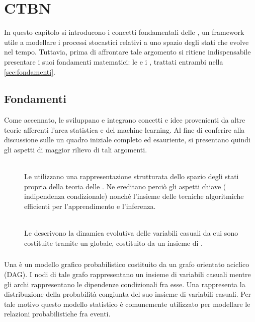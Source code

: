 
\chapter{CTBN}
\label{cap:ctbn}
In questo capitolo si introducono i concetti fondamentali delle \ctbn{}, un framework utile a modellare i processi stocastici relativi a uno spazio degli stati che evolve nel tempo.
Tuttavia, prima di affrontare tale argomento si ritiene indispensabile presentare i suoi fondamenti matematici: le \bn{} e i \mprocess{}, trattati entrambi nella \autoref{sec:fondamenti}.

\section{Fondamenti}
\label{sec:fondamenti}
Come accennato, le \ctbn{} sviluppano e integrano concetti e idee provenienti da altre teorie afferenti l'area statistica e del machine learning. Al fine di conferire alla discussione sulle \ctbn{} un quadro iniziale completo ed esauriente, si presentano quindi gli aspetti di maggior rilievo di tali argomenti.
\begin{description}
\item[\bn{}] \hfill \\
Le \ctbn{} utilizzano una rappresentazione strutturata dello spazio degli stati propria della teoria delle \bn{}. Ne ereditano perciò gli aspetti chiave (\ie{} indipendenza condizionale) nonché l'insieme delle tecniche algoritmiche efficienti per l'apprendimento e l'inferenza.
\item[\mprocess{}] \hfill \\
Le \ctbn{} descrivono la dinamica evolutiva delle variabili casuali da cui sono costituite tramite un \omprocess{} globale, costituito da un insieme di \cmprocess{}.
\end{description} 

\subsection{\bn{}}
\label{sec:bns}
Una \bn{} è un modello grafico probabilistico costituito da un grafo orientato aciclico (DAG). I nodi di tale grafo rappresentano un insieme di variabili casuali mentre gli archi rappresentano le dipendenze condizionali fra esse. Una \bn{} rappresenta la distribuzione della probabilità congiunta del suo insieme di variabili casuali. Per tale motivo questo modello statistico è comunemente utilizzato per modellare le relazioni probabilistiche fra eventi.



